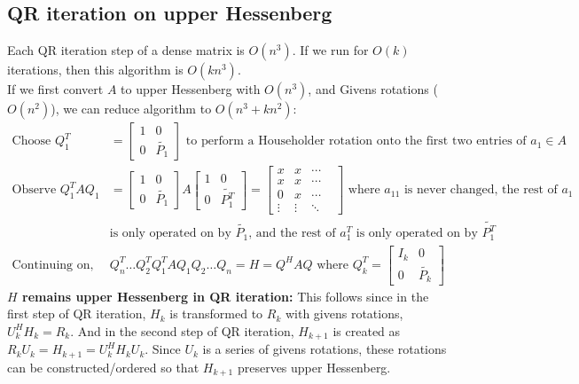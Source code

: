 \documentclass{article}
\begin{document}
\subsection{QR iteration on upper Hessenberg}
Each QR iteration step of a dense matrix is $O(n^3)$. If we run for $O(k)$ iterations, then this algorithm is $O(kn^3)$.\\
If we first convert $A$ to upper Hessenberg with $O(n^3)$, and Givens rotations ($O(n^2)$), we can reduce algorithm to $O(n^3 + kn^2)$:
\begin{align*}
    \textrm{Choose } Q_1^T &= \begin{bmatrix} 1 & 0 \\ 0 & \tilde{P_1} \end{bmatrix} \textrm{ to perform a Householder rotation onto the first two entries of } a_1 \in A\\
    \textrm{Observe }Q_1^T A Q_1 &= \begin{bmatrix} 1 & 0 \\ 0 & \tilde{P_1} \end{bmatrix} A \begin{bmatrix} 1 & 0 \\ 0 & \tilde{P_1^T} \end{bmatrix} = \begin{bmatrix} x & x & \cdots & \\
        x & x & \cdots \\ 0 & x &\cdots \\ \vdots & \vdots & \ddots \end{bmatrix} \textrm{ where $a_{11}$ is never changed, the rest of $a_1$}\\
        &\textrm{is only operated on by $\tilde{P_1}$, and the rest of $a_1^T$ is only operated on by $\tilde{P_1^T}$}\\
    \textrm{Continuing on, } & Q_n^T \dots Q_2^TQ_1^T A Q_1Q_2 \dots Q_n = H = Q^HAQ \textrm{ where } Q_k^T = \begin{bmatrix} I_k & 0 \\ 0 & \tilde{P_k} \end{bmatrix}
\end{align*}
\textbf{$H$ remains upper Hessenberg in QR iteration:} This follows since in the first step of QR iteration, $H_k$ is transformed to $R_k$ with givens rotations, $U_k^HH_k = R_k$. And in the second step of QR iteration, $H_{k+1}$ is created as $R_kU_k = H_{k+1} = U_k^HH_kU_k$. Since $U_k$ is a series of givens rotations, these rotations can be constructed/ordered so that $H_{k+1}$ preserves upper Hessenberg.
\end{document}
